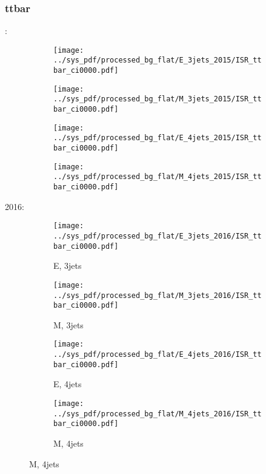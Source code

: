 \documentclass{beamer}
\begin{document}
\begin{frame}
\frametitle{ttbar}
\fontsize{5}{1}:
\begin{figure}
\centering
\begin{subfigure}[b]{0.24\textwidth}
\texttt{[image: ../sys\_pdf/processed\_bg\_flat/E\_3jets\_2015/ISR\_ttbar\_ci0000.pdf]}
\end{subfigure}
\begin{subfigure}[b]{0.24\textwidth}
\texttt{[image: ../sys\_pdf/processed\_bg\_flat/M\_3jets\_2015/ISR\_ttbar\_ci0000.pdf]}
\end{subfigure}
\begin{subfigure}[b]{0.24\textwidth}
\texttt{[image: ../sys\_pdf/processed\_bg\_flat/E\_4jets\_2015/ISR\_ttbar\_ci0000.pdf]}
\end{subfigure}
\begin{subfigure}[b]{0.24\textwidth}
\texttt{[image: ../sys\_pdf/processed\_bg\_flat/M\_4jets\_2015/ISR\_ttbar\_ci0000.pdf]}
\end{subfigure}
\end{figure}
2016:
\begin{figure}
\centering
\begin{subfigure}[b]{0.24\textwidth}
\texttt{[image: ../sys\_pdf/processed\_bg\_flat/E\_3jets\_2016/ISR\_ttbar\_ci0000.pdf]}
\captionsetup{font=tiny}
\caption{E, 3jets}
\end{subfigure}
\begin{subfigure}[b]{0.24\textwidth}
\texttt{[image: ../sys\_pdf/processed\_bg\_flat/M\_3jets\_2016/ISR\_ttbar\_ci0000.pdf]}
\captionsetup{font=tiny}
\caption{M, 3jets}
\end{subfigure}
\begin{subfigure}[b]{0.24\textwidth}
\texttt{[image: ../sys\_pdf/processed\_bg\_flat/E\_4jets\_2016/ISR\_ttbar\_ci0000.pdf]}
\captionsetup{font=tiny}
\caption{E, 4jets}
\end{subfigure}
\begin{subfigure}[b]{0.24\textwidth}
\texttt{[image: ../sys\_pdf/processed\_bg\_flat/M\_4jets\_2016/ISR\_ttbar\_ci0000.pdf]}
\captionsetup{font=tiny}
\caption{M, 4jets}
\end{subfigure}
\end{figure}
\end{frame}
\end{document}
